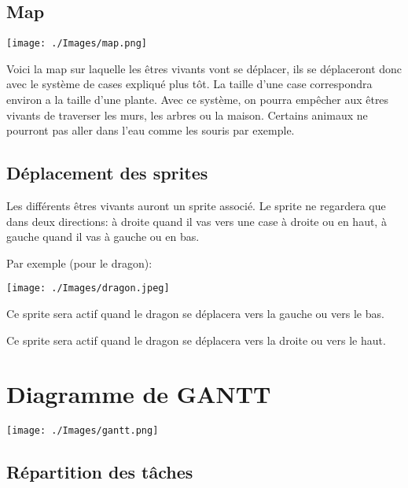 \documentclass[a4paper,12pt]{article} %
\begin{document}
\subsection{Map}
\begin{minipage}{0.95\textwidth}
\texttt{[image: ./Images/map.png]}
\end{minipage}
\newline
\newline
Voici la map sur laquelle les êtres vivants vont se déplacer, ils se déplaceront donc avec le système de cases expliqué plus tôt. La taille d'une case correspondra environ a la taille d'une plante. Avec ce système, on pourra empêcher aux êtres vivants de traverser les murs, les arbres ou la maison. Certains animaux ne pourront pas aller dans l'eau comme les souris par exemple.

\subsection{Déplacement des sprites}
Les différents êtres vivants auront un sprite associé. Le sprite ne regardera que dans deux directions: à droite quand il vas vers une case à droite ou en haut, à gauche quand il vas à gauche ou en bas.
\newpage
\begin{center}
Par exemple (pour le dragon):

\texttt{[image: ./Images/dragon.jpeg]}

Ce sprite sera actif quand le dragon se déplacera vers la gauche ou vers le bas.

\item
Ce sprite sera actif quand le dragon se déplacera vers la droite ou vers le haut.

\end{center}






\section{Diagramme de GANTT}
\begin{minipage}{1.1\textwidth}
\texttt{[image: ./Images/gantt.png]}
\end{minipage}



\subsection{Répartition des tâches}
\end{document}
